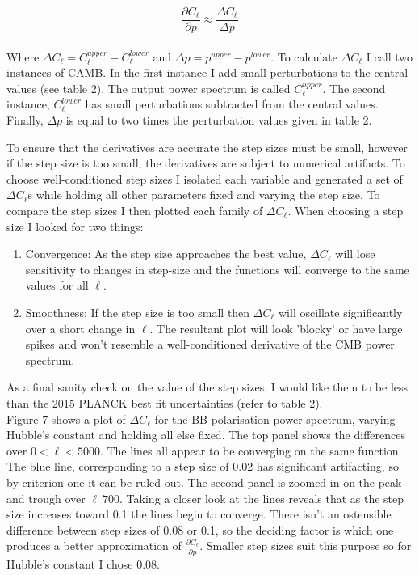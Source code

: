 \begin{equation}
\frac{\partial C_{\ell}}{\partial p} \approx \frac{\Delta C_{\ell}}{\Delta p}
\end{equation}
\\
Where $\Delta C_{\ell} = C^{upper}_{\ell} - C^{lower}_{\ell}$ and $\Delta p = p^{upper} - p^{lower}$. To calculate $\Delta C_{\ell}$ I call two instances of CAMB. In the first instance I add small perturbations to the central values (see table 2). The output power spectrum is called $C^{upper}_{\ell}$. The second instance, $C^{lower}_{\ell}$ has small perturbations subtracted from the central values. Finally, $\Delta p$ is equal to two times the perturbation values given in table 2.

To ensure that the derivatives are accurate the step sizes must be small, however if the step size is too small, the derivatives are subject to numerical artifacts. To choose well-conditioned step sizes I isolated each variable and generated a set of $\Delta C_{\ell}$s while holding all other parameters fixed and varying the step size. To compare the step sizes I then plotted each family of $\Delta C_{\ell}$. When choosing a step size I looked for two things:

\begin{enumerate}
\item Convergence: As the step size approaches the best value, $\Delta C_{\ell}$ will lose sensitivity to changes in step-size and the functions will converge to the same values for all $\ell$.

\item Smoothness: If the step size is too small then $\Delta C_{\ell}$ will oscillate significantly over a short change in $\ell$. The resultant plot will look 'blocky' or have large spikes and won't resemble a well-conditioned derivative of the CMB power spectrum.
\end{enumerate}

As a final sanity check on the value of the step sizes, I would like them to be less than the 2015 PLANCK best fit uncertainties (refer to table 2).
\\
Figure 7 shows a plot of $\Delta C_{\ell}$ for the BB polarisation power spectrum, varying Hubble's constant and holding all else fixed. The top panel shows the differences over $ 0 < \ell < 5000$. The lines all appear to be converging on the same function. The blue line, corresponding to a step size of 0.02 has significant artifacting, so by criterion one it can be ruled out. The second panel is zoomed in on the peak and trough over $\ell ~ 700$. Taking a closer look at the lines reveals that as the step size increases toward 0.1 the lines begin to converge. There isn't an ostensible difference between step sizes of 0.08 or 0.1, so the deciding factor is which one produces a better approximation of $\frac{\partial C_{\ell}}{\partial p}$. Smaller step sizes suit this purpose so for Hubble's constant I chose 0.08.

